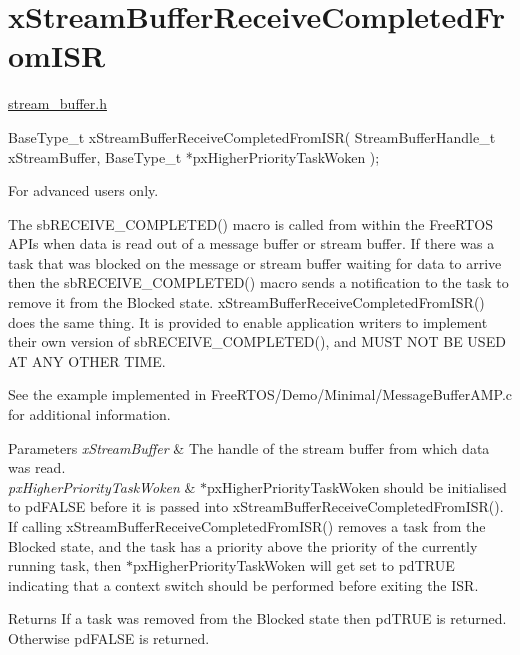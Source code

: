\hypertarget{group__x_stream_buffer_receive_completed_from_i_s_r}{}\section{x\+Stream\+Buffer\+Receive\+Completed\+From\+I\+SR}
\label{group__x_stream_buffer_receive_completed_from_i_s_r}
\mbox{\hyperlink{stream__buffer_8h_source}{stream\+\_\+buffer.\+h}}


\begin{DoxyPre}
BaseType\_t xStreamBufferReceiveCompletedFromISR( StreamBufferHandle\_t xStreamBuffer, BaseType\_t *pxHigherPriorityTaskWoken );
\end{DoxyPre}


For advanced users only.

The sb\+R\+E\+C\+E\+I\+V\+E\+\_\+\+C\+O\+M\+P\+L\+E\+T\+E\+D() macro is called from within the Free\+R\+T\+OS A\+P\+Is when data is read out of a message buffer or stream buffer. If there was a task that was blocked on the message or stream buffer waiting for data to arrive then the sb\+R\+E\+C\+E\+I\+V\+E\+\_\+\+C\+O\+M\+P\+L\+E\+T\+E\+D() macro sends a notification to the task to remove it from the Blocked state. x\+Stream\+Buffer\+Receive\+Completed\+From\+I\+S\+R() does the same thing. It is provided to enable application writers to implement their own version of sb\+R\+E\+C\+E\+I\+V\+E\+\_\+\+C\+O\+M\+P\+L\+E\+T\+E\+D(), and M\+U\+ST N\+OT BE U\+S\+ED AT A\+NY O\+T\+H\+ER T\+I\+ME.

See the example implemented in Free\+R\+T\+O\+S/\+Demo/\+Minimal/\+Message\+Buffer\+A\+M\+P.\+c for additional information.


\begin{DoxyParams}{Parameters}
{\em x\+Stream\+Buffer} & The handle of the stream buffer from which data was read.\\
\hline
{\em px\+Higher\+Priority\+Task\+Woken} & $\ast$px\+Higher\+Priority\+Task\+Woken should be initialised to pd\+F\+A\+L\+SE before it is passed into x\+Stream\+Buffer\+Receive\+Completed\+From\+I\+S\+R(). If calling x\+Stream\+Buffer\+Receive\+Completed\+From\+I\+S\+R() removes a task from the Blocked state, and the task has a priority above the priority of the currently running task, then $\ast$px\+Higher\+Priority\+Task\+Woken will get set to pd\+T\+R\+UE indicating that a context switch should be performed before exiting the I\+SR.\\
\hline
\end{DoxyParams}
\begin{DoxyReturn}{Returns}
If a task was removed from the Blocked state then pd\+T\+R\+UE is returned. Otherwise pd\+F\+A\+L\+SE is returned. 
\end{DoxyReturn}
